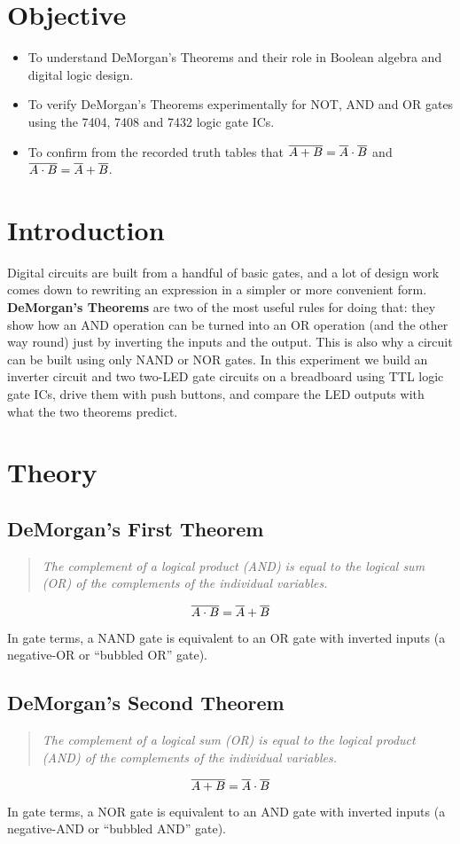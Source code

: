 \section{Objective}
\begin{itemize}[roomy]
	\item To understand DeMorgan's Theorems and their role in Boolean algebra and digital logic design.
	\item To verify DeMorgan's Theorems experimentally for NOT, AND and OR gates using the 7404, 7408 and 7432 logic gate ICs.
	\item To confirm from the recorded truth tables that $\overline{A+B}=\overline{A}\cdot\overline{B}$ and $\overline{A\cdot B}=\overline{A}+\overline{B}$.
\end{itemize}

\section{Introduction}
Digital circuits are built from a handful of basic gates, and a lot of design work comes down to rewriting an expression in a simpler or more convenient form. \textbf{DeMorgan's Theorems} are two of the most useful rules for doing that: they show how an AND operation can be turned into an OR operation (and the other way round) just by inverting the inputs and the output. This is also why a circuit can be built using only NAND or NOR gates. In this experiment we build an inverter circuit and two two-LED gate circuits on a breadboard using TTL logic gate ICs, drive them with push buttons, and compare the LED outputs with what the two theorems predict.

\section{Theory}

\subsection{DeMorgan's First Theorem}
\begin{quote}\itshape
	The complement of a logical product (AND) is equal to the logical sum (OR) of the complements of the individual variables.
\end{quote}
\[
\overline{A\cdot B}=\overline{A}+\overline{B}
\]
In gate terms, a NAND gate is equivalent to an OR gate with inverted inputs (a negative-OR or ``bubbled OR'' gate).

\subsection{DeMorgan's Second Theorem}
\begin{quote}\itshape
	The complement of a logical sum (OR) is equal to the logical product (AND) of the complements of the individual variables.
\end{quote}
\[
\overline{A+B}=\overline{A}\cdot\overline{B}
\]
In gate terms, a NOR gate is equivalent to an AND gate with inverted inputs (a negative-AND or ``bubbled AND'' gate).

